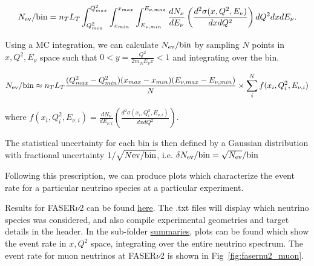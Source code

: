 \begin{equation}
    N_{\rm ev}/{\rm bin} = n_T L_T\int_{Q^2_{min}}^{Q^2_{max}}\int_{x_{min}}^{x_{max}}\int_{E_{\nu,min}}^{E_{\nu , max}} \frac{dN_{\nu}}{dE_{\nu}}\left(\frac{d^2\sigma(x,Q^2,E_{\nu})}{dxdQ^2}\right) dQ^2 dx dE_{\nu}.
\end{equation}

Using a MC integration, we can calculate $N_{\rm ev}/{\rm bin}$ by sampling $N$ points in $x,Q^2,E_{\nu}$ space such that $0< y = \frac{Q^2}{2m_N E_{\nu }x} < 1$ and integrating over the bin.

\begin{equation}
    N_{\rm ev}/{\rm bin} \approx n_T L_T \frac{(Q^2_{max}-Q^2_{min})(x_{max}-x_{min})(E_{\nu ,max}-E_{\nu ,min})}{N}\times \sum_i^N f(x_i,Q^2_i,E_{\nu ,i})
    \label{MCintegration}
\end{equation}

where $f(x_i,Q^2_i,E_{\nu ,i}) = \frac{dN_{\nu}}{dE_{\nu,i}}\left(\frac{d^2\sigma(x_i,Q^2_i,E_{\nu,i})}{dxdQ^2}\right)$. 

The statistical uncertainty for each bin is then defined by a Gaussian distribution with fractional uncertainty $1/\sqrt{N{\rm ev}/{\rm bin}}$, i.e. $\delta N_{\rm ev}/{\rm bin} = \sqrt{N_{\rm ev}} /{\rm bin}$


  Following this prescription, we can produce plots which characterize the event rate for a particular neutrino species at a particular experiment. 

Results for FASER$\nu$2 can be found \href{https://github.com/juanrojochacon/FPF-WG1/tree/main/results}{here}. The .txt files will display which neutrino species was considered, and also compile experimental geometries and target details in the header. In the sub-folder \href{https://github.com/juanrojochacon/FPF-WG1/tree/main/results/Summaries}{summaries}, plots can be found which show the event rate in $x,Q^2$ space, integrating over the entire neutrino spectrum. The event rate for muon neutrinos at FASER$\nu$2 is shown in Fig~\ref{fig:fasernu2_muon}.

